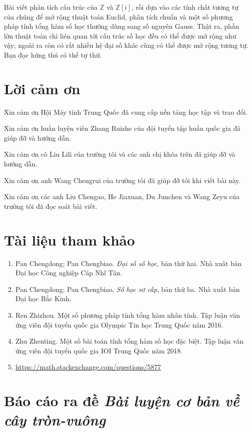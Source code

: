 \documentclass[11pt]{article}
\begin{document}
Bài viết phân tích cấu trúc của \(\mathbb Z\) và \(\mathbb Z[i]\), rồi dựa
vào các tính chất tương tự của chúng để mở rộng thuật toán Euclid, phân tích
chuẩn và một số phương pháp tính tổng hàm số học thường dùng sang số nguyên
Gauss. Thật ra, phần lớn thuật toán chỉ liên quan tới cấu trúc số học đều có
thể được mở rộng như vậy; ngoài ra còn có rất nhiều hệ đại số khác cũng có
thể được mở rộng tương tự. Bạn đọc hứng thú có thể tự thử.

\section*{Lời cảm ơn}

Xin cảm ơn Hội Máy tính Trung Quốc đã cung cấp nền tảng học tập và trao đổi.

Xin cảm ơn huấn luyện viên Zhang Ruizhe của đội tuyển tập huấn quốc gia đã
giúp đỡ và hướng dẫn.

Xin cảm ơn cô Liu Lili của trường tôi và các anh chị khóa trên đã giúp đỡ và
hướng dẫn.

Xin cảm ơn anh Wang Chengrui của trường tôi đã giúp đỡ tôi khi viết bài này.

Xin cảm ơn các anh Liu Chengao, He Jiaxuan, Du Junchen và Wang Zeyu của
trường tôi đã đọc soát bài viết.

\section*{Tài liệu tham khảo}

\begin{enumerate}
  \item Pan Chengdong; Pan Chengbiao. \emph{Đại số số học}, bản thứ hai. Nhà
        xuất bản Đại học Công nghiệp Cáp Nhĩ Tân.
  \item Pan Chengdong; Pan Chengbiao. \emph{Số học sơ cấp}, bản thứ ba. Nhà
        xuất bản Đại học Bắc Kinh.
  \item Ren Zhizhou. Một số phương pháp tính tổng hàm nhân tính. Tập luận văn
        ứng viên đội tuyển quốc gia Olympic Tin học Trung Quốc năm 2016.
  \item Zhu Zhenting. Một số bài toán tính tổng hàm số học đặc biệt. Tập luận
        văn ứng viên đội tuyển quốc gia IOI Trung Quốc năm 2018.
  \item \url{https://math.stackexchange.com/questions/5877}
\end{enumerate}

\clearpage
\section*{Báo cáo ra đề \emph{Bài luyện cơ bản về cây tròn-vuông}}
\end{document}
